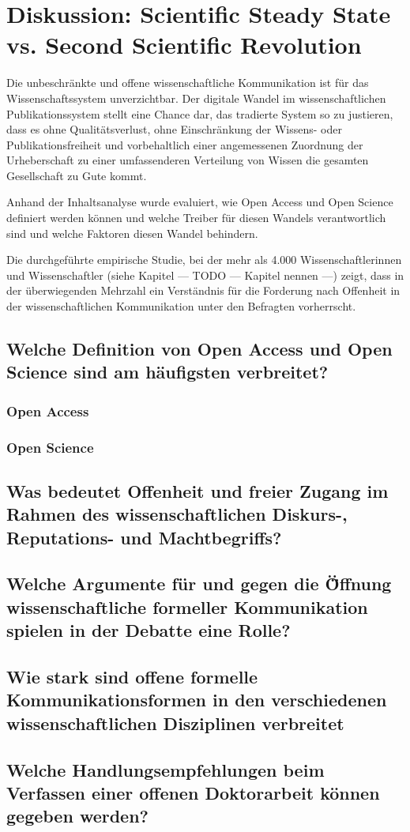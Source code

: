 \chapter{Diskussion: Scientific Steady State vs. Second Scientific Revolution}

Die unbeschränkte und offene wissenschaftliche Kommunikation ist für das Wissenschaftssystem unverzichtbar. Der digitale Wandel im wissenschaftlichen Publikationssystem stellt eine Chance dar, das tradierte System so zu justieren, dass es ohne Qualitätsverlust, ohne Einschränkung der Wissens- oder Publikationsfreiheit und vorbehaltlich einer angemessenen Zuordnung der Urheberschaft zu einer umfassenderen Verteilung von Wissen die gesamten Gesellschaft zu Gute kommt.

Anhand der Inhaltsanalyse wurde evaluiert, wie Open Access und Open Science definiert werden können und welche Treiber für diesen Wandels verantwortlich sind und welche Faktoren diesen Wandel behindern.

Die durchgeführte empirische Studie, bei der mehr als 4.000 Wissenschaftlerinnen und Wissenschaftler (siehe Kapitel --- TODO --- Kapitel nennen ---) zeigt, dass in der überwiegenden Mehrzahl ein Verständnis für die Forderung nach Offenheit in der wissenschaftlichen Kommunikation unter den Befragten vorherrscht.

\section{Welche Definition von Open Access und Open Science sind am häufigsten verbreitet?}  
\subsection{Open Access}  
\subsection{Open Science}  

\section{Was bedeutet Offenheit und freier Zugang im Rahmen des wissenschaftlichen Diskurs-, Reputations- und Machtbegriffs?} 

\section{Welche Argumente für und gegen die Ö̈ffnung wissenschaftliche formeller Kommunikation spielen in der Debatte eine Rolle?} 

\section{Wie stark sind offene formelle Kommunikationsformen in den verschiedenen wissenschaftlichen Disziplinen verbreitet}  
 
\section{Welche Handlungsempfehlungen beim Verfassen einer offenen Doktorarbeit können gegeben werden?} 
